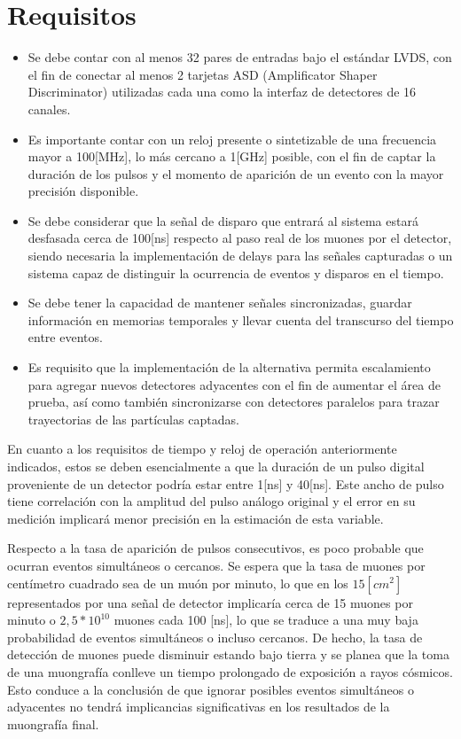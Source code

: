 \newpage
\section{Requisitos}
	
	\begin{itemize}
		\item Se debe contar con al menos 32 pares de entradas bajo el estándar LVDS, con el fin de conectar al menos 2 tarjetas ASD (Amplificator Shaper Discriminator) utilizadas cada una como la interfaz de detectores de 16 canales.
		\item Es importante contar con un reloj presente o sintetizable de una frecuencia mayor a 100[MHz], lo más cercano a 1[GHz] posible, con el fin de captar la duración de los pulsos y el momento de aparición de un evento con la mayor precisión disponible.
		\item Se debe considerar que la señal de disparo que entrará al sistema estará desfasada cerca de 100[ns] respecto al paso real de los muones por el detector, siendo necesaria la implementación de delays para las señales capturadas o un sistema capaz de distinguir la ocurrencia de eventos y disparos en el tiempo.
		\item  Se debe tener la capacidad de mantener señales sincronizadas, guardar información en memorias temporales y llevar cuenta del transcurso del tiempo entre eventos.
		\item Es requisito que la implementación de la alternativa permita escalamiento para agregar nuevos detectores adyacentes con el fin de aumentar el área de prueba, así como también sincronizarse con detectores paralelos para trazar trayectorias de las partículas captadas.
	\end{itemize}
	
	En cuanto a los requisitos de tiempo y reloj de operación anteriormente indicados, estos se deben esencialmente a que la duración de un pulso digital proveniente de un detector podría estar entre 1[ns] y 40[ns]\cite{1999ATLASICs}. Este ancho de pulso tiene correlación con la amplitud del pulso análogo original y el error en su medición implicará menor precisión en la estimación de esta variable.
	
	Respecto a la tasa de aparición de pulsos consecutivos, es poco probable que ocurran eventos simultáneos o cercanos. Se espera que la tasa de muones por centímetro cuadrado sea de un muón por minuto, lo que en los $15[cm^2]$ representados por una señal de detector implicaría cerca de 15 muones por minuto o $2,5*10^{10}$ muones cada 100 [ns], lo que se traduce a una muy baja probabilidad de eventos simultáneos o incluso cercanos. De hecho, la tasa de detección de muones puede disminuir estando bajo tierra y se planea que la toma de una muongrafía conlleve un tiempo prolongado de exposición a rayos cósmicos. Esto conduce a la conclusión de que ignorar posibles eventos simultáneos o adyacentes no tendrá implicancias significativas en los resultados de la muongrafía final.

